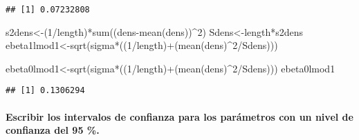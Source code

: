 \documentclass[
]{article}
\newenvironment{Shaded}{\begin{snugshade}}{\end{snugshade}}
\newcommand{\CommentTok}[1]{\textcolor[rgb]{0.56,0.35,0.01}{\textit{#1}}}
\newcommand{\DecValTok}[1]{\textcolor[rgb]{0.00,0.00,0.81}{#1}}
\newcommand{\FloatTok}[1]{\textcolor[rgb]{0.00,0.00,0.81}{#1}}
\newcommand{\FunctionTok}[1]{\textcolor[rgb]{0.00,0.00,0.00}{#1}}
\newcommand{\NormalTok}[1]{#1}
\newcommand{\OtherTok}[1]{\textcolor[rgb]{0.56,0.35,0.01}{#1}}
\newcommand{\SpecialCharTok}[1]{\textcolor[rgb]{0.00,0.00,0.00}{#1}}
\begin{document}
\begin{verbatim}
## [1] 0.07232808
\end{verbatim}

\begin{Shaded}
\begin{Highlighting}[]
\NormalTok{s2dens}\OtherTok{\textless{}{-}}\NormalTok{(}\DecValTok{1}\SpecialCharTok{/}\NormalTok{length)}\SpecialCharTok{*}\FunctionTok{sum}\NormalTok{((dens}\SpecialCharTok{{-}}\FunctionTok{mean}\NormalTok{(dens))}\SpecialCharTok{\^{}}\DecValTok{2}\NormalTok{)}
\NormalTok{Sdens}\OtherTok{\textless{}{-}}\NormalTok{length}\SpecialCharTok{*}\NormalTok{s2dens}
\NormalTok{ebeta1lmod1}\OtherTok{\textless{}{-}}\FunctionTok{sqrt}\NormalTok{(sigma}\SpecialCharTok{*}\NormalTok{((}\DecValTok{1}\SpecialCharTok{/}\NormalTok{length)}\SpecialCharTok{+}\NormalTok{(}\FunctionTok{mean}\NormalTok{(dens)}\SpecialCharTok{\^{}}\DecValTok{2}\SpecialCharTok{/}\NormalTok{Sdens)))}
\end{Highlighting}
\end{Shaded}

\begin{Shaded}
\begin{Highlighting}[]
\NormalTok{ebeta0lmod1}\OtherTok{\textless{}{-}}\FunctionTok{sqrt}\NormalTok{(sigma}\SpecialCharTok{*}\NormalTok{((}\DecValTok{1}\SpecialCharTok{/}\NormalTok{length)}\SpecialCharTok{+}\NormalTok{(}\FunctionTok{mean}\NormalTok{(dens)}\SpecialCharTok{\^{}}\DecValTok{2}\SpecialCharTok{/}\NormalTok{Sdens)))}
\NormalTok{ebeta0lmod1}
\end{Highlighting}
\end{Shaded}

\begin{verbatim}
## [1] 0.1306294
\end{verbatim}

\hypertarget{escribir-los-intervalos-de-confianza-para-los-paruxe1metros-con-un-nivel-de-confianza-del-95-.}{%
\paragraph{Escribir los intervalos de confianza para los parámetros con
un nivel de confianza del 95
\%.}\label{escribir-los-intervalos-de-confianza-para-los-paruxe1metros-con-un-nivel-de-confianza-del-95-.}}

\begin{Shaded}
\end{Shaded}
\end{document}
